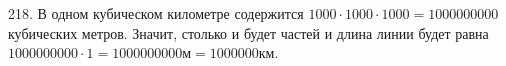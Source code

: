 218. В одном кубическом километре содержится $1000\cdot1000\cdot1000=1000000000$ кубических метров. Значит, столько и будет частей и длина линии будет равна $1000000000\cdot1=1000000000$м$=1000000$км.\\
